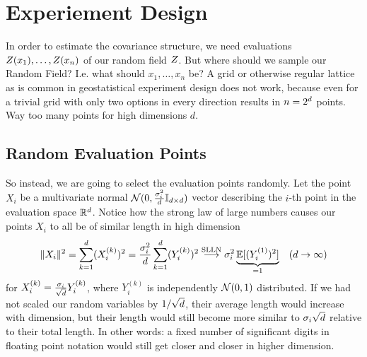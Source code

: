 \section{Experiement Design}

In order to estimate the covariance
structure, we need evaluations \(Z(x_1),\dots,Z(x_n)\) of our random
field \(Z\). But where should we sample our Random Field? I.e. what should
\(x_1,\dots, x_n\) be? A grid or otherwise regular lattice as is common in
geostatistical experiment design \parencite[e.g.][Section 4.1]{mullerCollectingSpatialData2007} does not work, because even for a trivial
grid with only two options in every direction results in \(n=2^d\) points.
Way too many points for high dimensions \(d\).

\subsection{Random Evaluation Points}

So instead, we are going to select the evaluation points randomly. Let the point
\(X_i\) be a multivariate normal \(\mathcal{N}(0,\frac{\sigma_i^2}{d}
\mathbb{I}_{d\times d})\) vector describing the \(i\)-th point
in the evaluation space \(\mathbb{R}^d\). Notice how the strong law of large
numbers causes our points \(X_i\) to all be of similar length in high dimension
\[
	\|X_i\|^2 = \sum_{k=1}^d (X_i^{(k)})^2
	= \frac{\sigma_i^2}{d} \sum_{k=1}^d (Y_i^{(k)})^2 
	\overset{\text{SLLN}}\longrightarrow\sigma_i^2\underbrace{\mathbb{E}[(Y_i^{(1)})^2]}_{=1} \quad (d\to \infty)
\]
for \(X_i^{(k)} = \frac{\sigma_i}{\sqrt{d}}Y_i^{(k)}\), where \(Y_i^{(k)}\) is
independently \(\mathcal{N}(0,1)\) distributed. If we had not scaled our random
variables by \(1/{\sqrt{d}}\), their average length would increase
with dimension, but their length would still become more similar to
\(\sigma_i\sqrt{d}\) relative to their total length. In other words:
a fixed number of significant digits in floating point notation would still get
closer and closer in higher dimension.

